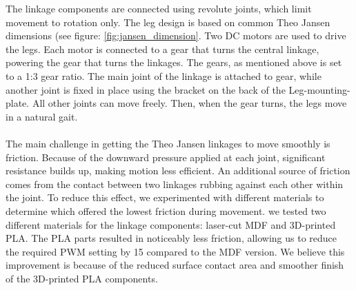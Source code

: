The linkage components are connected using revolute joints, which limit movement to rotation only. The leg design is based on common Theo Jansen dimensions (see figure: \ref{fig:jansen_dimension}. Two DC motors are used to drive the legs. Each motor is connected to a gear that turns the central linkage, powering the gear that turns the linkages. The gears, as mentioned above is set to a 1:3 gear ratio. The main joint of the linkage is attached to gear, while another joint is fixed in place using the bracket on the back of the Leg-mounting-plate. All other joints can move freely. Then, when the gear turns, the legs move in a natural gait. 
\\ \\
The main challenge in getting the Theo Jansen linkages to move smoothly is friction. Because of the downward pressure applied at each joint, significant resistance builds up, making motion less efficient. An additional source of friction comes from the contact between two linkages rubbing against each other within the joint. To reduce this effect, we experimented with different materials to determine which offered the lowest friction during movement. we tested two different materials for the linkage components: laser-cut MDF and 3D-printed PLA. The PLA parts resulted in noticeably less friction, allowing us to reduce the required PWM setting by 15 compared to the MDF version. We believe this improvement is because of the reduced surface contact area and smoother finish of the 3D-printed PLA components. \\
